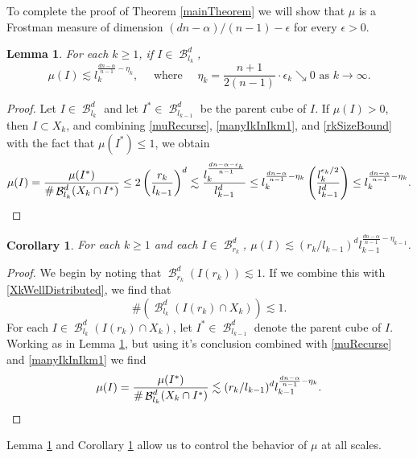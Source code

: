 \documentclass[dvipsnames,letterpaper,12pt]{article}
\numberwithin{equation}{section}
\theoremstyle{plain}
\newtheorem{lemma}{Lemma}
\newtheorem{corollary}{Corollary}
\theoremstyle{remark}
\DeclareMathOperator{\B}{\mathcal{B}}
\begin{document}
To complete the proof of Theorem \ref{mainTheorem} we will show that $\mu$ is a Frostman measure of dimension $(dn - \alpha)/(n - 1)-\epsilon$ for every $\epsilon>0$. 
\begin{lemma}\label{massSomeScales}
	For each $k \geq 1$, if $I \in \B^d_{l_k}$,
	\[ \mu(I) \lesssim l_k^{\frac{dn-\alpha}{n-1}- \eta_k}, \quad \text{ where } \quad \eta_k = \frac{n+1}{2(n-1)} \cdot \epsilon_k \searrow 0 \text{ as } k \rightarrow \infty. \]
\end{lemma}
\begin{proof}
	Let $I \in \B^d_{l_k}$ and let $I^* \in \B^d_{l_{k-1}}$ be the parent cube of $I$. If $\mu(I) > 0$, then $I \subset X_k$, and combining \eqref{muRecurse}, \eqref{manyIkInIkm1}, and \eqref{rkSizeBound} with the fact that $\mu(I^*) \leq 1$, we obtain
	\[ \mu(I) = \frac{\mu(I^*)}{\# \B^d_{l_k}(X_k \cap I^*)} \leq 2 \left( \frac{r_k}{l_{k-1}} \right)^d \lesssim \frac{l_k^{\frac{dn - \alpha - \epsilon_k}{n-1}}}{l_{k-1}^d} \leq l_k^{\frac{dn - \alpha}{n-1} - \eta_k} \left( \frac{l_k^{\epsilon_k/2}}{l_{k-1}^d} \right) \leq l_k^{\frac{dn - \alpha}{n-1} - \eta_k}. \qedhere \]
\end{proof}

\begin{corollary}\label{muAtScaleRk}
	For each $k \geq 1$ and each $I \in \B^d_{r_k}$, $\mu(I) \lesssim (r_k/l_{k-1})^d l_{k-1}^{\frac{dn-\alpha}{n-1}-\eta_{k-1}}$.
\end{corollary}
\begin{proof}
	We begin by noting that $\B^d_{r_k}(I(r_k)) \lesssim 1$. If we combine this with \eqref{XkWellDistributed}, we find that
	\begin{equation} \label{oneBound}
		\#(\B^d_{l_k}(I(r_k) \cap X_k)) \lesssim 1.
	\end{equation}
	For each $I \in \B^d_{l_k}(I(r_k) \cap X_k)$, let $I^* \in \B^d_{l_{k-1}}$ denote the parent cube of $I$. Working as in Lemma \ref{massSomeScales}, but using it's conclusion combined with \eqref{muRecurse} and \eqref{manyIkInIkm1} we find
	\[ \mu(I) = \frac{\mu(I^*)}{\# \B_{l_k}^d(X_k \cap I^*)} \lesssim (r_k/l_{k-1})^d l_{k-1}^{\frac{dn - \alpha}{n-1} - \eta_k}. \qedhere \]
\end{proof}

Lemma \ref{massSomeScales} and Corollary \ref{muAtScaleRk} allow us to control the behavior of $\mu$ at all scales. 
\end{document}
